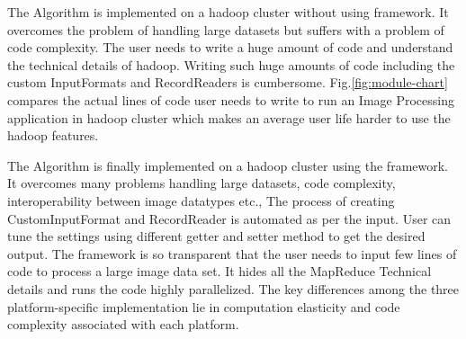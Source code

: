 \documentclass[conference]{IEEEtran}
\begin{document}
The Algorithm is implemented on a hadoop cluster without using framework. It overcomes the problem of handling large datasets but suffers with a problem of code complexity. The user needs to write a huge amount of code and understand the technical details of hadoop. Writing such huge amounts of code including the custom InputFormats and RecordReaders is cumbersome. Fig.\ref{fig:module-chart} compares the actual lines of code user needs to write to run an Image Processing application in hadoop cluster which makes an average user life harder to use the hadoop features.

The Algorithm is finally implemented on a hadoop cluster using the framework. It overcomes many problems handling large datasets, code complexity, interoperability between image datatypes etc., The process of creating CustomInputFormat and RecordReader is automated as per the input. User can tune the settings using different getter and setter method to get the desired output. The framework is so transparent that the user needs to input few lines of code to process a large image data set. It hides all the MapReduce Technical details and runs the code highly parallelized. The key differences among the three platform-specific implementation lie in computation elasticity and code complexity associated with each platform.
\end{document}
